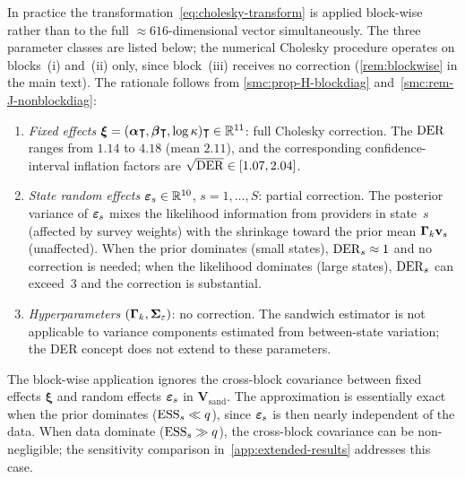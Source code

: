 
\begin{remark}
\label{smc:rem-blockwise}
  In practice the transformation~\eqref{eq:cholesky-transform} is applied
  block-wise rather than to the full
  $\approx\!616$-dimensional vector simultaneously.  The three
  parameter classes are listed below; the numerical Cholesky procedure
  operates on blocks~(i) and~(ii) only, since block~(iii) receives no
  correction
  (\cref{rem:blockwise} in the main text).  The rationale follows from
  \cref{smc:prop-H-blockdiag} and~\cref{smc:rem-J-nonblockdiag}\textup{:}
  \begin{enumerate}[label=\textup{(\roman*)},nosep]
    \item \emph{Fixed effects}
      $\boldsymbol{\xi}
      = (\boldsymbol{\alpha}\intercal,\boldsymbol{\beta}\intercal,\log\kappa)\intercal \in \mathbb{R}^{11}$\textup{:}
      full Cholesky correction.  The $\operatorname{DER}$ ranges from $1.14$ to
      $4.18$ (mean $2.11$), and the corresponding confidence-interval
      inflation factors are $\sqrt{\operatorname{DER}} \in [1.07, 2.04]$.
    \item \emph{State random effects}
      $\boldsymbol{\varepsilon}_s \in \mathbb{R}^{10}$, $s = 1,\ldots,S$\textup{:} partial
      correction.  The posterior variance of $\boldsymbol{\varepsilon}_s$ mixes the
      likelihood information from providers in state~$s$ (affected by
      survey weights) with the shrinkage toward the prior mean
      $\boldsymbol{\Gamma}_k\mathbf{v}_s$ (unaffected).  When the prior
      dominates (small states), $\operatorname{DER}_s \approx 1$ and no correction
      is needed; when the likelihood dominates (large states),
      $\operatorname{DER}_s$ can exceed~$3$ and the correction is substantial.
    \item \emph{Hyperparameters}
      $(\boldsymbol{\Gamma}_k, \boldsymbol{\Sigma}_\varepsilon)$\textup{:} no correction.
      The sandwich estimator is not applicable to variance components
      estimated from between-state variation; the DER concept does not
      extend to these parameters.
  \end{enumerate}
\end{remark}


\begin{remark}
\label{smc:rem-blockwise-quality}
  The block-wise application ignores the cross-block covariance between
  fixed effects $\boldsymbol{\xi}$ and random effects $\boldsymbol{\varepsilon}_s$ in
  $\mathbf{V}_{\mathrm{sand}}$.  The approximation is essentially exact
  when the prior dominates ($\text{ESS}_s \ll q$), since $\boldsymbol{\varepsilon}_s$ is then
  nearly independent of the data.  When data dominate ($\text{ESS}_s \gg q$),
  the cross-block covariance can be non-negligible; the sensitivity
  comparison in~\cref{app:extended-results} addresses this case.
\end{remark}

